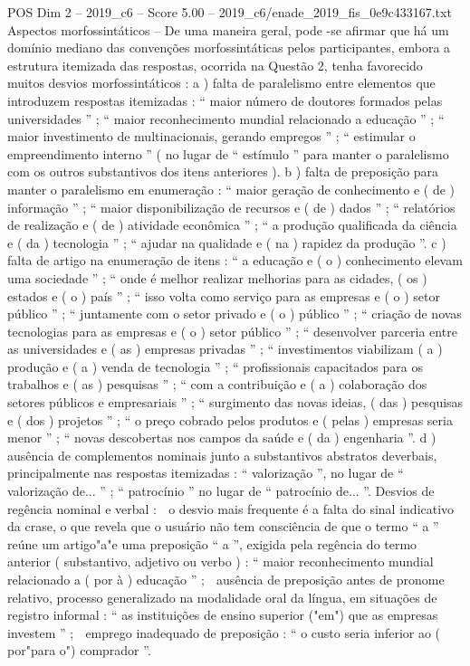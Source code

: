 \begin{textsample}{POS Dim 2 – 2019\_c6 – Score 5.00 – 2019\_c6/enade\_2019\_fis\_0e9c433167.txt}
Aspectos morfossintáticos – De uma maneira geral, pode -se afirmar que há um domínio mediano das convenções morfossintáticas pelos participantes, embora a estrutura itemizada das respostas, ocorrida na Questão 2, tenha favorecido muitos desvios morfossintáticos : a ) falta de paralelismo entre elementos que introduzem respostas itemizadas : “ maior número de doutores formados pelas universidades ” ; “ maior reconhecimento mundial relacionado a educação ” ; “ maior investimento de multinacionais, gerando empregos ” ; “ estimular o empreendimento interno ” ( no lugar de “ estímulo ” para manter o paralelismo com os outros substantivos dos itens anteriores ). b ) falta de preposição para manter o paralelismo em enumeração : “ maior geração de conhecimento e ( de ) informação ” ; “ maior disponibilização de recursos e ( de ) dados ” ; “ relatórios de realização e ( de ) atividade econômica ” ; “ a produção qualificada da ciência e ( da ) tecnologia ” ; “ ajudar na qualidade e ( na ) rapidez da produção ”. c ) falta de artigo na enumeração de itens : “ a educação e ( o ) conhecimento elevam uma sociedade ” ; “ onde é melhor realizar melhorias para as cidades, ( os ) estados e ( o ) país ” ; “ isso volta como serviço para as empresas e ( o ) setor público ” ; “ juntamente com o setor privado e ( o ) público ” ; “ criação de novas tecnologias para as empresas e ( o ) setor público ” ; “ desenvolver parceria entre as universidades e ( as ) empresas privadas ” ; “ investimentos viabilizam ( a ) produção e ( a ) venda de tecnologia ” ; “ profissionais capacitados para os trabalhos e ( as ) pesquisas ” ; “ com a contribuição e ( a ) colaboração dos setores públicos e empresariais ” ; “ surgimento das novas ideias, ( das ) pesquisas e ( dos ) projetos ” ; “ o preço cobrado pelos produtos e ( pelas ) empresas seria menor ” ; “ novas descobertas nos campos da saúde e ( da ) engenharia ”. d ) ausência de complementos nominais junto a substantivos abstratos deverbais, principalmente nas respostas itemizadas : “ valorização ”, no lugar de “ valorização de... ” ; “ patrocínio ” no lugar de “ patrocínio de... ”.
Desvios de regência nominal e verbal :  o desvio mais frequente é a falta do sinal indicativo da crase, o que revela que o usuário não tem consciência de que o termo “ a ” reúne um artigo"a"e uma preposição “ a ”, exigida pela regência do termo anterior ( substantivo, adjetivo ou verbo ) : “ maior reconhecimento mundial relacionado a ( por à ) educação ” ;  ausência de preposição antes de pronome relativo, processo generalizado na modalidade oral da língua, em situações de registro informal : “ as instituições de ensino superior ("em") que as empresas investem ” ;  emprego inadequado de preposição : “ o custo seria inferior ao ( por"para o") comprador ”.

\end{textsample}
